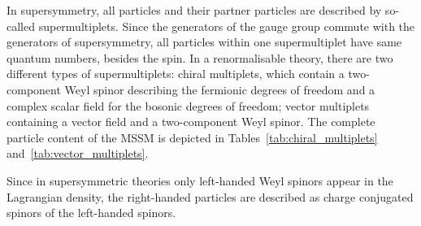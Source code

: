 In supersymmetry, all particles and their partner particles are described by so-called supermultiplets.
Since the generators of the gauge group commute with the generators of supersymmetry, all particles within one supermultiplet have same quantum numbers, besides the spin.
In a renormalisable theory, there are two different types of supermultiplets: chiral multiplets, which contain a two-component Weyl spinor describing the fermionic degrees of freedom and a complex scalar field for the bosonic degrees of freedom; vector multiplets containing a vector field and a two-component Weyl spinor.
The complete particle content of the MSSM is depicted in Tables~\ref{tab:chiral_multiplets} and~\ref{tab:vector_multiplets}.

Since in supersymmetric theories only left-handed Weyl spinors appear in the Lagrangian density, the right-handed particles are described as charge conjugated spinors of the left-handed spinors.


